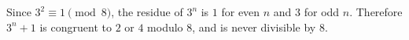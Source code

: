 Since $3^2\equiv1\pmod8$, the residue of $3^n$ is $1$ for even $n$ and $3$ for odd $n$. Therefore $3^n+1$ is congruent to $2$ or $4$ modulo $8$, and is never divisible by $8$.
